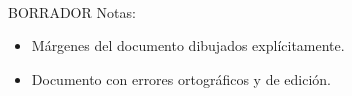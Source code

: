 \begin{titlepage}
    \vspace*{\fill}
    \begin{center}
        {\crest}\\[1.3cm]
        {\Large \gradua}\\
        {\espezialitatea}\\[1.5cm]

        {\large {\gapizenburua}}\\[0.2cm]
        \HRule\\[0.5cm]

        {
        \LARGE
        \begin{spacing}{0.5}
        \textbf{\izenburua}
        \end{spacing}
        }
        \vspace{0.5cm}
        \HRule\\[2.0cm]

        { \egileatestua\\}
        {\Large \textsl{\egilea}\\}
        \vspace{1.0cm}

        {\large \textsf{\urtea}}
        \begin{tcolorbox}[breakable]
            BORRADOR\@
            Notas:
            \begin{itemize}
                \item Márgenes del documento dibujados explícitamente.
                \item Documento con errores ortográficos y de edición.
            \end{itemize}
        \end{tcolorbox}
    \end{center}
    \vspace*{\fill}
\end{titlepage}

\cleardoublepage%

